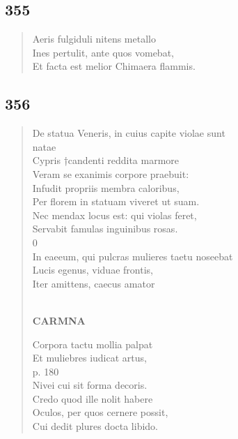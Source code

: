 \documentclass[11pt, a4paper]{report}
\begin{document}
            \subsection*{355}
      \begin{verse}
      Aeris fulgiduli nitens metallo \\ Ines pertulit, ante quos vomebat, \\ Et facta est melior Chimaera flammis. \\ 
      \end{verse}
  
            \subsection*{356}
      \begin{verse}
      De statua Veneris, in cuius capite violae sunt \\ natae \\ Cypris †candenti reddita marmore \\ Veram se exanimis corpore praebuit: \\ Infudit propriis membra caloribus, \\ Per florem in statuam viveret ut suam. \\ Nec mendax locus est: qui violas feret, \\ Servabit famulas inguinibus rosas. \\ 0 \\ In eaeeum, qui pulcras mulieres taetu noseebat \\ Lucis egenus, viduae frontis, \\ Iter amittens, caecus amator \\ 
        ﻿\pagebreak 
    \begin{center} \textbf{CARMNA} \end{center} \marginpar{[280]} Corpora tactu mollia palpat \\ Et muliebres iudicat artus, \\ p. 180 \\ Nivei cui sit forma decoris. \\ Credo quod ille nolit habere \\ Oculos, per quos cernere possit, \\ Cui dedit plures docta libido. \\ 
      \end{verse}
  
\end{document}
